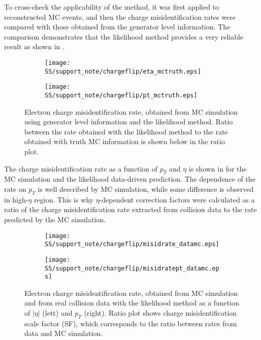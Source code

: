 To cross-check the applicability of the method, it was first applied to reconstructed MC events, and then the charge misidentification rates were compared with those obtained from the generator level information. 
The comparison demonstrates that the likelihood method provides a very reliable result as shown in
.

\begin{figure}
\begin{subfigure}{.5\textwidth}
  \centering
  \texttt{[image: SS/support\_note/chargeflip/eta\_mctruth.eps]}
\end{subfigure}%
\begin{subfigure}{.5\textwidth}
  \centering
  \texttt{[image: SS/support\_note/chargeflip/pt\_mctruth.eps]}
\end{subfigure}
\caption{Electron charge misidentification rate, obtained from MC simulation using generator level information and the likelihood method. 
Ratio between the rate obtained with the likelihood method to the rate obtained with truth MC information is shown below in the ratio plot. }
\label{fig:likelihood_cross_check}
\end{figure}

The charge misidentification rate as a function of $p_T$ and $\eta$ is shown in 
for the MC simulation and the likelihood data-driven prediction.
The dependence of the rate on $p_T$ is well described by MC simulation, while some difference is observed
in high-$\eta$ region. This is why $\eta$-dependent correction factors were calculated as a ratio of the charge misidentification rate extracted from collision data to the rate predicted by the MC simulation.

\begin{figure}
\begin{subfigure}{.5\textwidth}
  \centering
  \texttt{[image: SS/support\_note/chargeflip/misidrate\_datamc.eps]}
\end{subfigure}%
\begin{subfigure}{.5\textwidth}
  \centering
  \texttt{[image: SS/support\_note/chargeflip/misidratept\_datamc.eps]}
\end{subfigure}
\caption{Electron charge misidentification rate, obtained from MC simulation and from real collision data with the likelihood method as a function of $|\eta|$ (lett) and $p_T$ (right).
Ratio plot shows charge misidentification scale factor (SF), which corresponds to the ratio between rates from data and MC simulation.}
\label{fig:charge_flip_data_vs_mc}
\end{figure}

